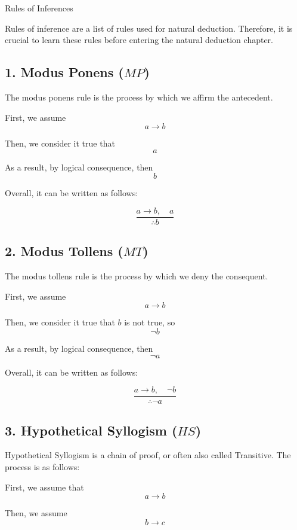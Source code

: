 Rules of Inferences

Rules of inference are a list of rules used for natural deduction.
Therefore, it is crucial to learn these rules before entering the
natural deduction chapter.

\subsection{\texorpdfstring{1. Modus Ponens
(\(MP\))}{1. Modus Ponens (MP)}}\label{modus-ponens-mp}

The modus ponens rule is the process by which we affirm the antecedent.

First, we assume \[a \rightarrow b\]

Then, we consider it true that \[a\]

As a result, by logical consequence, then \[b\]

Overall, it can be written as follows:

\[\frac{a  \rightarrow b, \quad a}{\therefore b}\]

\subsection{\texorpdfstring{2. Modus Tollens
(\(MT\))}{2. Modus Tollens (MT)}}\label{modus-tollens-mt}

The modus tollens rule is the process by which we deny the consequent.

First, we assume \[a \rightarrow  b\]

Then, we consider it true that \(b\) is not true, so \[\neg  b\]

As a result, by logical consequence, then \[\neg a\]

Overall, it can be written as follows:

\[\frac{a \rightarrow b, \quad \neg b}{\therefore \neg a}\]

\subsection{\texorpdfstring{3. Hypothetical Syllogism
(\(HS\))}{3. Hypothetical Syllogism (HS)}}\label{hypothetical-syllogism-hs}

Hypothetical Syllogism is a chain of proof, or often also called
Transitive. The process is as follows:

First, we assume that \[a \rightarrow b\]

Then, we assume \[b \rightarrow c\]

